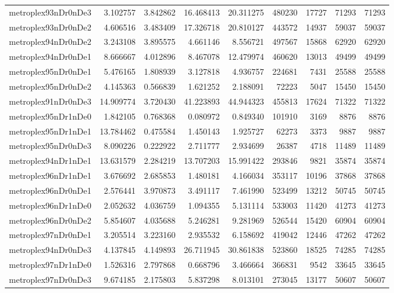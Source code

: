 \begin{longtable}{|l|r|r|r|r|r|r|r|r|}
metroplex93nDr0nDe3 & 3.102757 & 3.842862 & 16.468413 & 20.311275 & 480230 & 17727 & 71293 & 71293 \\
metroplex93nDr0nDe2 & 4.606516 & 3.483409 & 17.326718 & 20.810127 & 443572 & 14937 & 59037 & 59037 \\
metroplex94nDr0nDe2 & 3.243108 & 3.895575 & 4.661146 & 8.556721 & 497567 & 15868 & 62920 & 62920 \\
metroplex94nDr0nDe1 & 8.666667 & 4.012896 & 8.467078 & 12.479974 & 460620 & 13013 & 49499 & 49499 \\
metroplex95nDr0nDe1 & 5.476165 & 1.808939 & 3.127818 & 4.936757 & 224681 & 7431 & 25588 & 25588 \\
metroplex95nDr0nDe2 & 4.145363 & 0.566839 & 1.621252 & 2.188091 & 72223 & 5047 & 15450 & 15450 \\
metroplex91nDr0nDe3 & 14.909774 & 3.720430 & 41.223893 & 44.944323 & 455813 & 17624 & 71322 & 71322 \\
metroplex95nDr1nDe0 & 1.842105 & 0.768368 & 0.080972 & 0.849340 & 101910 & 3169 & 8876 & 8876 \\
metroplex95nDr1nDe1 & 13.784462 & 0.475584 & 1.450143 & 1.925727 & 62273 & 3373 & 9887 & 9887 \\
metroplex95nDr0nDe3 & 8.090226 & 0.222922 & 2.711777 & 2.934699 & 26387 & 4718 & 11489 & 11489 \\
metroplex94nDr1nDe1 & 13.631579 & 2.284219 & 13.707203 & 15.991422 & 293846 & 9821 & 35874 & 35874 \\
metroplex96nDr1nDe1 & 3.676692 & 2.685853 & 1.480181 & 4.166034 & 353117 & 10196 & 37868 & 37868 \\
metroplex96nDr0nDe1 & 2.576441 & 3.970873 & 3.491117 & 7.461990 & 523499 & 13212 & 50745 & 50745 \\
metroplex96nDr1nDe0 & 2.052632 & 4.036759 & 1.094355 & 5.131114 & 533003 & 11420 & 41273 & 41273 \\
metroplex96nDr0nDe2 & 5.854607 & 4.035688 & 5.246281 & 9.281969 & 526544 & 15420 & 60904 & 60904 \\
metroplex97nDr0nDe1 & 3.205514 & 3.223160 & 2.935532 & 6.158692 & 419042 & 12446 & 47262 & 47262 \\
metroplex94nDr0nDe3 & 4.137845 & 4.149893 & 26.711945 & 30.861838 & 523860 & 18525 & 74285 & 74285 \\
metroplex97nDr1nDe0 & 1.526316 & 2.797868 & 0.668796 & 3.466664 & 366831 & 9542 & 33645 & 33645 \\
metroplex97nDr0nDe3 & 9.674185 & 2.175803 & 5.837298 & 8.013101 & 273045 & 13177 & 50607 & 50607 \\

\end{longtable}
